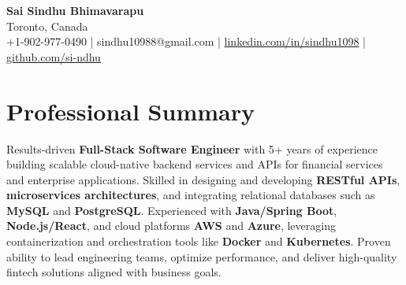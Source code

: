 \documentclass[letterpaper,11pt]{article}
\begin{document}
\begin{center}
  {\Large \textbf{Sai Sindhu Bhimavarapu}} \\
  Toronto, Canada \\
  +1-902-977-0490 \enspace | \enspace sindhu10988@gmail.com \enspace | \enspace \href{https://www.linkedin.com/in/sindhu1098/}{linkedin.com/in/sindhu1098} \enspace | \enspace \href{https://github.com/si-ndhu}{github.com/si-ndhu}
\end{center}

\section{Professional Summary}
  \begin{itemize}[leftmargin=0.15in, label={}]
    \small{\item{
     Results-driven \textbf{Full-Stack Software Engineer} with 5+ years of experience building scalable cloud-native backend services and APIs for financial services and enterprise applications. Skilled in designing and developing \textbf{RESTful APIs}, \textbf{microservices architectures}, and integrating relational databases such as \textbf{MySQL} and \textbf{PostgreSQL}. Experienced with \textbf{Java/Spring Boot}, \textbf{Node.js/React}, and cloud platforms \textbf{AWS} and \textbf{Azure}, leveraging containerization and orchestration tools like \textbf{Docker} and \textbf{Kubernetes}. Proven ability to lead engineering teams, optimize performance, and deliver high-quality fintech solutions aligned with business goals.
    }}
  \end{itemize}
\vspace{-16pt}

\end{document}
